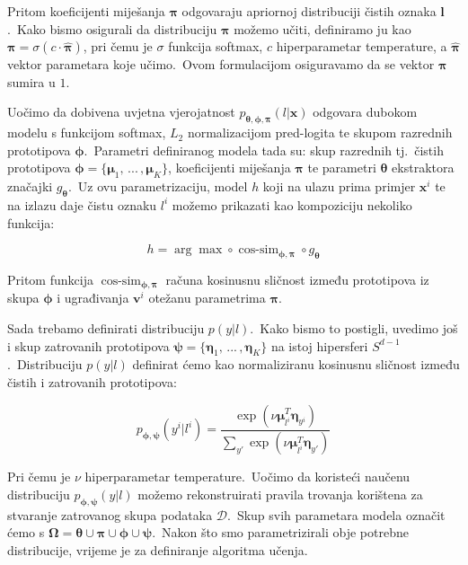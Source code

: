 \documentclass[diplomskirad]{fer}
\begin{document}
Pritom koeficijenti miješanja $\bm{\pi}$ odgovaraju apriornoj distribuciji čistih oznaka $\bm{l}$.\ 
Kako bismo osigurali da distribuciju $\bm{\pi}$ možemo učiti, definiramo ju kao $\bm{\pi} = \sigma (c \cdot \bm{\hat{\pi}})$, pri čemu je $\sigma$ funkcija softmax, $c$ hiperparametar temperature, a $\bm{\hat{\pi}}$ vektor parametara koje učimo.\ 
Ovom formulacijom osiguravamo da se vektor $\bm{\pi}$ sumira u $1$.\

Uočimo da dobivena uvjetna vjerojatnost $p_{\bm{\theta}, \bm{\phi}, \bm{\pi}}(l | \bm{x})$ odgovara dubokom modelu s funkcijom softmax, $L_2$ normalizacijom pred-logita te skupom razrednih prototipova $\bm{\phi}$.\ 
Parametri definiranog modela tada su: skup razrednih tj.\ čistih prototipova $\bm{\phi} = \{\bm{\mu}_1,\,...\,,\bm{\mu}_K\}$, koeficijenti miješanja $\bm{\pi}$ te parametri $\bm{\theta}$ ekstraktora značajki $g_{\bm{\theta}}$.\ 
Uz ovu parametrizaciju, model $h$ koji na ulazu prima primjer $\bm{x}^i$ te na izlazu daje čistu oznaku $l^i$ možemo prikazati kao kompoziciju nekoliko funkcija:

\begin{equation}
  h = \arg \max \circ \operatorname{cos\text{-}sim}_{\bm{\phi}, \bm{\pi}} \circ g_{\bm{\theta}}
  \label{eq:h_form}
\end{equation}

Pritom funkcija $\operatorname{cos\text{-}sim}_{\bm{\phi}, \bm{\pi}}$ računa kosinusnu sličnost između prototipova iz skupa $\bm{\phi}$ i ugrađivanja $\bm{v}^i$ otežanu parametrima $\bm{\pi}$.\ 

Sada trebamo definirati distribuciju $p(y | l)$.\ Kako bismo to postigli, uvedimo još i skup zatrovanih prototipova $\bm{\psi} = \{\bm{\eta}_1,\,...\,,\bm{\eta}_K\}$ na istoj hipersferi $S^{d - 1}$.\ 
Distribuciju $p(y | l)$ definirat ćemo kao normaliziranu kosinusnu sličnost između čistih i zatrovanih prototipova:

\begin{equation}
  p_{\bm{\phi}, \bm{\psi}}(y^i | l^i) = \frac{\exp(\nu \bm{\mu}_{l^i}^T \bm{\eta}_{y^i})}{\sum_{y'} \exp(\nu \bm{\mu}_{l^i}^T \bm{\eta}_{y'})}
  \label{eq:p_y_l}
\end{equation}

Pri čemu je $\nu$ hiperparametar temperature.\ Uočimo da koristeći naučenu distribuciju $p_{\bm{\phi}, \bm{\psi}}(y | l)$ možemo rekonstruirati pravila trovanja korištena za stvaranje zatrovanog skupa podataka $\mathcal{D}$.\ 
Skup svih parametara modela označit ćemo s $\bm{\Omega} = \bm{\theta} \cup \bm{\pi} \cup \bm{\phi} \cup \bm{\psi}$.\ Nakon što smo parametrizirali obje potrebne distribucije, vrijeme je za definiranje algoritma učenja.\
\end{document}
